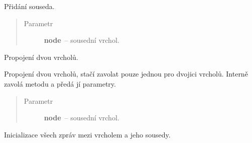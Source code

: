 \begin{fulllineitems}
\begin{fulllineitems}
\end{fulllineitems}


\begin{fulllineitems}
\label{alex.infer:alex.infer.factor.alex.infer.node.DiscreteVariableNode.add_neighbor}
Přidání souseda.
\begin{quote}\begin{description}
\item[{Parametr}] \leavevmode
\textbf{node}~-- sousední vrchol.

\end{description}\end{quote}

\end{fulllineitems}


\begin{fulllineitems}
\label{alex.infer:alex.infer.factor.alex.infer.node.DiscreteVariableNode.connect}
Propojení dvou vrcholů.

Propojení dvou vrcholů, stačí zavolat pouze jednou pro dvojici vrcholů.
Interně zavolá metodu {\hyperref[alex.infer:alex.infer.factor.alex.infer.node.DiscreteVariableNode.add_neighbor]{}} a předá jí parametry.
\begin{quote}\begin{description}
\item[{Parametr}] \leavevmode
\textbf{node}~-- sousední vrchol.

\end{description}\end{quote}

\end{fulllineitems}


\begin{fulllineitems}
\label{alex.infer:alex.infer.factor.alex.infer.node.DiscreteVariableNode.init_messages}
Inicializace všech zpráv mezi vrcholem a jeho sousedy.

\end{fulllineitems}


\end{fulllineitems}
